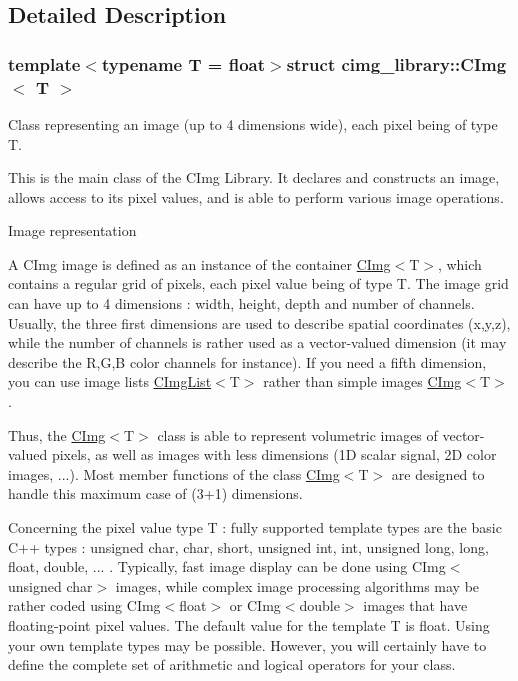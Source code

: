 \subsection{Detailed Description}
\subsubsection*{template$<$typename T = float$>$struct cimg\-\_\-library\-::\-C\-Img$<$ T $>$}

Class representing an image (up to 4 dimensions wide), each pixel being of type {\ttfamily T}. 

This is the main class of the C\-Img Library. It declares and constructs an image, allows access to its pixel values, and is able to perform various image operations.

\begin{DoxyParagraph}{Image representation}

\end{DoxyParagraph}
A C\-Img image is defined as an instance of the container \hyperlink{structcimg__library_1_1_c_img}{C\-Img}$<${\ttfamily T$>$}, which contains a regular grid of pixels, each pixel value being of type {\ttfamily T}. The image grid can have up to 4 dimensions \-: width, height, depth and number of channels. Usually, the three first dimensions are used to describe spatial coordinates {\ttfamily (x,y,z)}, while the number of channels is rather used as a vector-\/valued dimension (it may describe the R,G,B color channels for instance). If you need a fifth dimension, you can use image lists \hyperlink{structcimg__library_1_1_c_img_list}{C\-Img\-List}$<${\ttfamily T$>$} rather than simple images \hyperlink{structcimg__library_1_1_c_img}{C\-Img}$<${\ttfamily T$>$}.

Thus, the \hyperlink{structcimg__library_1_1_c_img}{C\-Img}$<${\ttfamily T$>$} class is able to represent volumetric images of vector-\/valued pixels, as well as images with less dimensions (1\-D scalar signal, 2\-D color images, ...). Most member functions of the class \hyperlink{structcimg__library_1_1_c_img}{C\-Img}$<${\ttfamily T$>$} are designed to handle this maximum case of (3+1) dimensions.

Concerning the pixel value type {\ttfamily T} \-: fully supported template types are the basic C++ types \-: {\ttfamily unsigned char, char, short, unsigned int, int, unsigned long, long, float, double, ... }. Typically, fast image display can be done using {\ttfamily C\-Img$<$unsigned char$>$} images, while complex image processing algorithms may be rather coded using {\ttfamily C\-Img$<$float$>$} or {\ttfamily C\-Img$<$double$>$} images that have floating-\/point pixel values. The default value for the template T is {\ttfamily float}. Using your own template types may be possible. However, you will certainly have to define the complete set of arithmetic and logical operators for your class.

